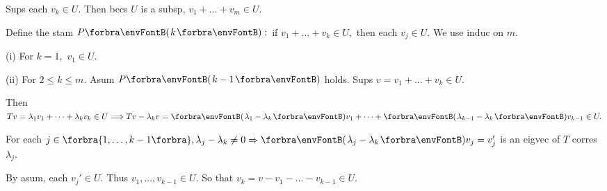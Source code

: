 \SepLine

\par\quad
Sups each $v_k\in U.$ Then becs $U$ is a subsp, $v_1+\dots+v_m\in U.$\par\quad
Define the stam $P\Par{k}:$ if $v_1+\dots+v_k\in U,$ then each $v_j\in U.$ We use induc on $m.$\par\quad
(i) For $k=1,$ $v_1\in U.$\par\quad\Endi
(ii) For $2\leqslant k\leqslant m.$ Asum $P\Par{k-1}$ holds. Sups $v=v_1+\dots+v_k\in U.$\par\quad\Hii
Then $Tv=\lambda_1v_1+\dots+\lambda_k v_k\in U\Longrightarrow Tv-\lambda_k v=\Par{\lambda_1-\lambda_k}v_1+\dots+\Par{\lambda_{k-1}-\lambda_k}v_{k-1}\in U.$\par\quad\Hii
For each $j\in\Bra{1,\dots,k-1},\lambda_j-\lambda_{k}\neq 0\Rightarrow\Par{\lambda_j-\lambda_k}v_j=v_j'$ is an eigvec of $T$ corres $\lambda_j.$\par\quad\Hii
By asum, each $v_j'\in U.$ Thus $v_1,\dots,v_{k-1}\in U.$ So that $v_k=v-v_1-\dots-v_{k-1}\in U.$\PfEnd
\SepLine[0pt][\Blind{\BulletPointX} ]

